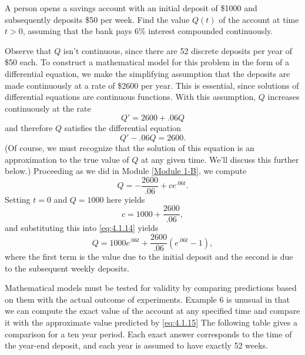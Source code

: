 \documentclass{ximera}
\begin{document}
\begin{example}\label{example:4.1.6}
A person opens a savings account with an initial deposit of \$1000 and
subsequently deposits \$50 per week. Find the value $Q(t)$ of the
account at time $t > 0$, assuming that the bank pays 6\%
interest compounded continuously.
\begin{explanation}
Observe that $Q$ isn't  continuous, since there are 52
discrete deposits per year of \$50 each. To construct a mathematical
model for this problem in the form of a differential equation, we make
the simplifying assumption that the deposits are made continuously at
a rate of \$2600 per year. This is essential, since solutions of
differential equations are continuous functions. With this assumption,
$Q$ increases continuously at the rate
$$
Q'=2600+.06 Q
$$
and therefore $Q$ satisfies the differential equation
\begin{equation} \label{eq:4.1.13}
Q'-.06Q=2600.
\end{equation}
(Of course, we must recognize that the solution of this equation
is an approximation to the true value of $Q$ at any given time. We'll
discuss this further below.)  
Proceeding as we did in Module \ref{Module 1-B}, we compute
\begin{equation} \label{eq:4.1.14}
Q=-\frac{2600}{.06}+ce^{.06t}.
\end{equation}
 Setting $t=0$ and $Q=1000$ here yields
$$
c=1000+\frac{2600}{.06},
$$
and substituting this into \eqref{eq:4.1.14} yields
\begin{equation} \label{eq:4.1.15}
Q=1000e^{.06t}+\frac{2600}{.06}(e^{.06t}-1),%
\end{equation}
where the first term is the value due to the initial deposit and the
second is due to the subsequent weekly deposits.
\end{explanation}
\end{example}

Mathematical models must be tested for validity by comparing
predictions based on them with the actual outcome of experiments.
Example 6 is unusual in that we can compute the exact value of the
account at any specified time and compare it with the approximate
value predicted by \eqref{eq:4.1.15} %
The following table gives a comparison for a ten year period. Each exact answer corresponds to the time of the year-end deposit, and each year is assumed to have exactly 52 weeks.
\end{document}
